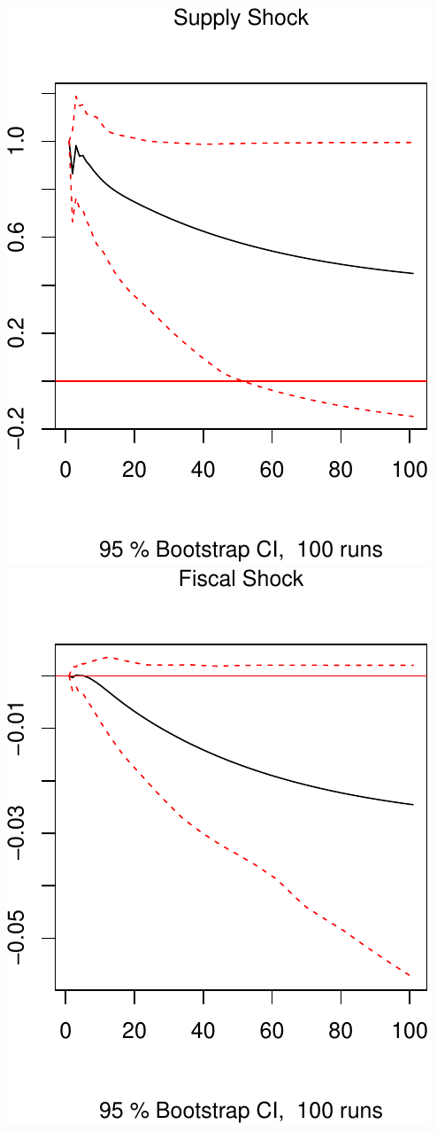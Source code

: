 \documentclass[11pt,preprint, authoryear]{elsarticle}
\numberwithin{equation}{section}
\numberwithin{figure}{section}
\numberwithin{table}{section}
\begin{document}
\includegraphics{TS_proj_files/figure-latex/unnamed-chunk-42-1.pdf}
\includegraphics{TS_proj_files/figure-latex/unnamed-chunk-42-2.pdf}
\end{document}
